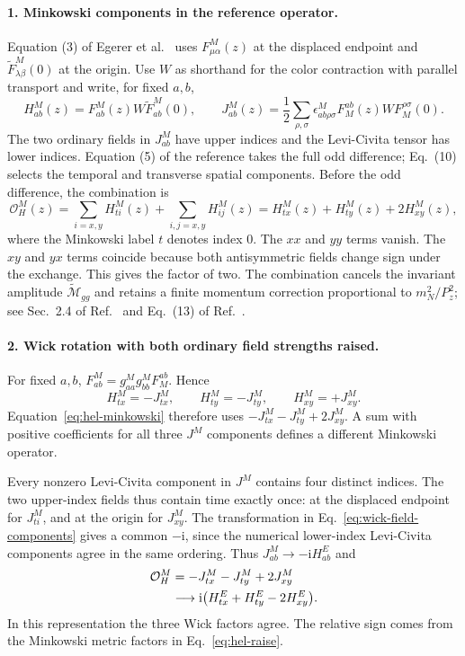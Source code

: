 \documentclass[11pt,a4paper]{article}
\newcommand{\ii}{\mathrm{i}}
\newcommand{\OPE}{\mathcal O}
\newcommand{\TM}{\widetilde F^{M}}
\begin{document}
\paragraph{1. Minkowski components in the reference operator.}
Equation (3) of Egerer et al.~\cite{Egerer} uses \(F^M_{\mu\alpha}(z)\) at
the displaced endpoint and \(\TM_{\lambda\beta}(0)\) at the origin. Use
\(W\) as shorthand for the color contraction with parallel transport and
write, for fixed \(a,b\),
\begin{equation}
 H^M_{ab}(z)=F^M_{ab}(z)W\TM_{ab}(0),\qquad
 J^M_{ab}(z)=\frac12\sum_{\rho,\sigma}\epsilon^M_{ab\rho\sigma}
        F_M^{ab}(z)W F_M^{\rho\sigma}(0).
 \label{eq:hel-mj}
\end{equation}
The two ordinary fields in \(J^M_{ab}\) have upper indices and the
Levi-Civita tensor has lower indices. Equation (5) of the reference takes
the full odd difference; Eq.~(10) selects the temporal and transverse
spatial components. Before the odd difference, the combination is
\begin{equation}
 \OPE_H^M(z)=\sum_{i=x,y}H^M_{ti}(z)+\sum_{i,j=x,y}H^M_{ij}(z)
            =H^M_{tx}(z)+H^M_{ty}(z)+2H^M_{xy}(z),
 \label{eq:hel-minkowski}
\end{equation}
where the Minkowski label \(t\) denotes index \(0\). The \(xx\) and \(yy\)
terms vanish. The \(xy\) and \(yx\) terms coincide because both
antisymmetric fields change sign under the exchange. This gives the
factor of two. The combination cancels the invariant amplitude
\(\widetilde{\mathcal M}_{gg}\) and retains a finite momentum correction
proportional to \(m_N^2/P_z^2\); see Sec.~2.4 of
Ref.~\cite{BMRH} and Eq.~(13) of Ref.~\cite{Egerer}.

\paragraph{2. Wick rotation with both ordinary field strengths raised.}
For fixed \(a,b\), \(F^M_{ab}=g^M_{aa}g^M_{bb}F_M^{ab}\). Hence
\begin{equation}
 H^M_{tx}=-J^M_{tx},\qquad H^M_{ty}=-J^M_{ty},\qquad H^M_{xy}=+J^M_{xy}.
 \label{eq:hel-raise}
\end{equation}
Equation~\eqref{eq:hel-minkowski} therefore uses
\(-J^M_{tx}-J^M_{ty}+2J^M_{xy}\). A sum with positive coefficients for all
three \(J^M\) components defines a different Minkowski operator.

Every nonzero Levi-Civita component in \(J^M\) contains four distinct
indices. The two upper-index fields thus contain time exactly once: at
the displaced endpoint for \(J^M_{ti}\), and at the origin for
\(J^M_{xy}\). The transformation in Eq.~\eqref{eq:wick-field-components}
gives a common \(-\ii\), since the numerical lower-index
Levi-Civita components agree in the same ordering. Thus
\(J^M_{ab}\longrightarrow-\ii H^E_{ab}\) and
\begin{align}
 \OPE_H^M&=-J^M_{tx}-J^M_{ty}+2J^M_{xy}\notag\\
 &\longrightarrow\ii\bigl(H^E_{tx}+H^E_{ty}-2H^E_{xy}\bigr).
 \label{eq:hel-wick-raised-op}
\end{align}
In this representation the three Wick factors agree. The relative sign
comes from the Minkowski metric factors in Eq.~\eqref{eq:hel-raise}.
\end{document}
